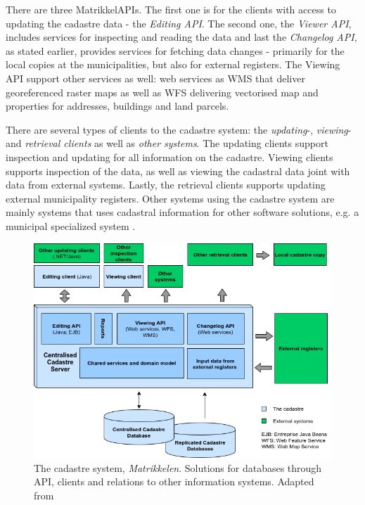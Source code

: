 There are three MatrikkelAPIs. The first one is for the clients with access to updating the cadastre data - the \textit{Editing API}. The second one, the \textit{Viewer API}, includes services for inspecting and reading the data and last the \textit{Changelog API}, as stated earlier, provides services for fetching data changes - primarily for the local copies at the municipalities, but also for external registers.  The Viewing API support other services as well: web services as WMS that deliver georeferenced raster maps
as well as WFS delivering vectorised map	and properties for addresses, buildings and land parcels. 

There are several types of clients to the cadastre system: the \textit{updating}-, \textit{viewing}- and \textit{retrieval clients} as well as \textit{other systems}. The updating clients support inspection and updating for all information on the cadastre. Viewing clients supports inspection of the data, as well as viewing the cadastral data joint with data from external systems. Lastly, the retrieval clients supports updating external municipality registers. Other systems using the cadastre system are mainly systems that uses cadastral information for other software solutions, e.g. a municipal specialized system \citep[p.~337-338]{Matrikkelavdelingen2017}.
 

\begin{figure}[H]
	\centering
	\includegraphics[scale=0.5]{img/matrikkelSYS}
	\caption{The cadastre system, \textit{Matrikkelen}. Solutions for databases through API, clients and relations to other information systems. Adapted from \citep[p.~337]{Matrikkelavdelingen2017} }
	\label{fig:matr}
\end{figure}

